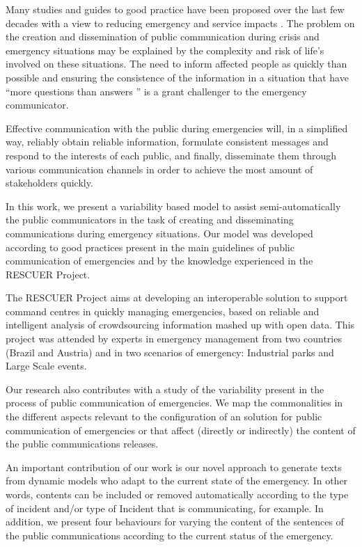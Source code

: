 Many studies and guides to good practice have been proposed over the last few decades with a view to reducing emergency and service impacts  \citep{cdc2014}\citep{cisvGuide}\citep{panamericanhealthorganization2009}\citep{reynolds2007crisis}\citep{seeger2006best}\citep{tinker2010}. The problem on the creation and dissemination of public communication during crisis and emergency situations may be explained by the complexity and risk of life's involved on these situations. The need to inform affected people as quickly than possible and ensuring the consistence of the information in a situation that have ``more questions than answers \citep{cdc2014}'' is a grant challenger to the emergency communicator.

 Effective communication with the public during emergencies will, in a simplified way, reliably obtain reliable information, formulate consistent messages and respond to the interests of each public, and finally, disseminate them through various communication channels in order to achieve the most amount of stakeholders quickly.

 In this work, we present a variability based model to assist semi-automatically the public communicators in the task of creating and disseminating communications during emergency situations.  Our model was developed according to good practices present in the main guidelines of public communication of emergencies and by the knowledge experienced in the RESCUER Project. 

The RESCUER Project aims at developing an interoperable solution to support command centres in quickly managing emergencies, based on reliable and intelligent analysis of crowdsourcing information mashed up with open data. This project was attended by experts in emergency management from two countries (Brazil and Austria) and in two scenarios of emergency: Industrial parks and Large Scale events.  

Our research also contributes with a study of the variability present in the process of public communication of emergencies. We map the commonalities in the different aspects relevant to the configuration of an solution for public communication of emergencies or that affect (directly or indirectly) the content of the public communications releases.

An important contribution of our work is our novel approach to generate texts from dynamic models who adapt to the current state of the emergency. In other words, contents can be included or removed automatically according to the type of incident and/or type of Incident that is communicating, for example. In addition, we present four behaviours for varying the content of the sentences of the public communications according to the current status of the emergency.

